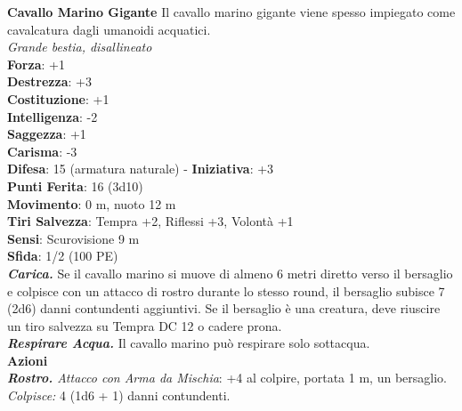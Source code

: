 \begin{multicols}{2}
\medskip\textbf{Cavallo Marino Gigante}
Il cavallo marino gigante viene spesso impiegato come cavalcatura dagli umanoidi acquatici.\\
\emph{Grande bestia, disallineato}\\
\textbf{Forza}: +1\\
\textbf{Destrezza}: +3\\
\textbf{Costituzione}: +1\\
\textbf{Intelligenza}: -2\\
\textbf{Saggezza}: +1\\
\textbf{Carisma}: -3\\
\textbf{Difesa}: 15 (armatura naturale) - \textbf{Iniziativa}: +3\\
\textbf{Punti Ferita}: 16 (3d10)\\
\textbf{Movimento}: 0 m, nuoto 12 m\\
\textbf{Tiri Salvezza}: Tempra +2, Riflessi +3, Volontà +1 \\
\textbf{Sensi}: Scurovisione 9 m\\
\textbf{Sfida}: 1/2 (100 PE)\smallskip\\
\emph{\textbf{Carica.}} Se il cavallo marino si muove di almeno 6 metri diretto verso il bersaglio e colpisce con un attacco di rostro durante lo stesso round, il bersaglio subisce 7 (2d6) danni contundenti aggiuntivi. Se il bersaglio è una creatura, deve riuscire un tiro salvezza su Tempra DC  12 o cadere prona.\\
\emph{\textbf{Respirare Acqua.}} Il cavallo marino può respirare solo sottacqua.\\
\smallskip\textbf{Azioni}\\
\emph{\textbf{Rostro.} Attacco con Arma da Mischia}: +4 al colpire, portata 1 m, un bersaglio.\\
\emph{Colpisce:} 4 (1d6 + 1) danni contundenti.\\


\end{multicols}
